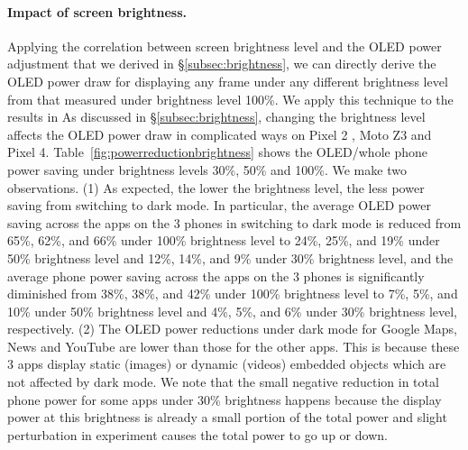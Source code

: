 \paragraph{Impact of screen brightness.}
Applying the correlation between screen brightness level and the OLED
power adjustment that we derived in
\S\ref{subsec:brightness}, we can directly derive the OLED power draw
for displaying any frame under any different brightness level from
that measured under brightness level 100\%.
We apply this technique to the results in
\fi
As discussed in \S\ref{subsec:brightness}, changing the brightness level
  affects the OLED power draw in complicated ways on Pixel 2 , Moto Z3 and Pixel 4.
  Table~\ref{fig:powerreductionbrightness}
  shows the OLED/whole phone power saving under brightness levels 30\%, 50\%
  and 100\%.
We make two observations.
(1) As expected, the lower the brightness level, the less power saving from switching
to  dark mode. In particular, 
the average OLED power saving across the apps on the 3 phones
in switching to dark mode is reduced
from 65\%, 62\%, and 66\% under 100\% brightness level
to 24\%, 25\%, and 19\% under 50\% brightness level
and 12\%, 14\%, and 9\% under 30\% brightness level,
and the average phone power saving across the apps on the 3 phones
is significantly diminished
from 38\%, 38\%, and 42\% under 100\% brightness level
to 7\%, 5\%, and 10\% under 50\% brightness level
and 4\%, 5\%, and 6\% under 30\% brightness level, respectively.
(2) The OLED power reductions under dark mode for Google Maps, News and YouTube 
are lower than those for the other apps. This is because these 3 apps
display static (images) or dynamic (videos) embedded objects %
which are not affected by dark mode.
We note that the small negative reduction in total phone power for some apps under 30\% brightness
happens because the display power at this brightness is already a small portion
of the total power and slight perturbation in experiment causes the total power to go up or down.



